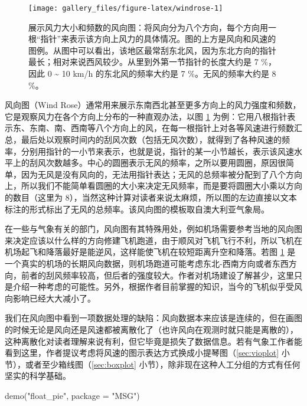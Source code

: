 \documentclass[
  b5paper,
  UTF8,twoside]{book}
\newenvironment{Shaded}{\begin{snugshade}}{\end{snugshade}}
\newcommand{\AttributeTok}[1]{\textcolor[rgb]{0.77,0.63,0.00}{#1}}
\newcommand{\FunctionTok}[1]{\textcolor[rgb]{0.00,0.00,0.00}{#1}}
\newcommand{\NormalTok}[1]{#1}
\newcommand{\StringTok}[1]{\textcolor[rgb]{0.31,0.60,0.02}{#1}}
\begin{document}
\begin{figure}

{\centering \texttt{[image: gallery\_files/figure-latex/windrose-1]} 

}

\caption[展示风力大小和频数的风向图]{展示风力大小和频数的风向图：将风向分为八个方向，每个方向用一根``指针''来表示该方向上风力的具体情况。图的上方是风向和风速的图例。从图中可以看出，该地区最常刮东北风，因为东北方向的指针最长；相对来说西风较少。从里到外第一节指针的长度大约是 7 \%，因此 0 \textasciitilde{} 10 km/h 的东北风的频率大约是 7 \%。无风的频率大约是 8 \%。}\label{fig:windrose}
\end{figure}

风向图（Wind Rose）通常用来展示东南西北甚至更多方向上的风力强度和频数，它是观察风力在各个方向上分布的一种直观办法，以图 \ref{fig:windrose}
为例：它用八根指针表示东、东南、南、西南等八个方向上的风，在每一根指针上对各等风速进行频数汇总，最后处以观察时间内的刮风次数（包括无风次数），就得到了各种风速的频率，分别用指针的一小节来表示，也就是说，指针的某一小节越长，表示该风速水平上的刮风次数越多。中心的圆圈表示无风的频率，之所以要用圆圈，原因很简单，因为无风是没有风向的，无法用指针表达；无风的总频率被分配到了八个方向上，所以我们不能简单看圆圈的大小来决定无风频率，而是要将圆圈大小乘以方向的数目（这里为 8），当然这种计算对读者来说太麻烦，所以图的左边直接以文本标注的形式标出了无风的总频率。该风向图的模板取自澳大利亚气象局。

在一些与气象有关的部门，风向图有其特殊用处，例如机场需要参考当地的风向图来决定应该以什么样的方向修建飞机跑道，由于顺风对飞机飞行不利，所以飞机在机场起飞和降落最好是能逆风，这样能使飞机在较短距离升空和降落。若图 \ref{fig:windrose} 是一个真实的机场的长期风向数据，则机场跑道可能考虑东北-西南方向或者东西方向，前者的刮风频率较高，但后者的强度较大。作者对机场建设了解甚少，这里只是介绍一种考虑的可能性。另外，根据作者目前掌握的知识，当今的飞机似乎受风向影响已经大大减小了。

我们在风向图中看到一项数据处理的缺陷：风向数据本来应该是连续的，但在画图的时候无论是风向还是风速都被离散化了（也许风向在观测时就只能是离散的），这种离散化对读者理解来说有利，但它毕竟是损失了数据信息。若有气象工作者能看到这里，作者提议考虑将风速的图示表达方式换成小提琴图（\ref{sec:vioplot} 小节），或者至少箱线图（\ref{sec:boxplot} 小节），除非现在这种人工分组的方式有任何坚实的科学基础。





\begin{Shaded}
\begin{Highlighting}[]
\FunctionTok{demo}\NormalTok{(}\StringTok{"float\_pie"}\NormalTok{, }\AttributeTok{package =} \StringTok{"MSG"}\NormalTok{)}
\end{Highlighting}
\end{Shaded}
\end{document}
